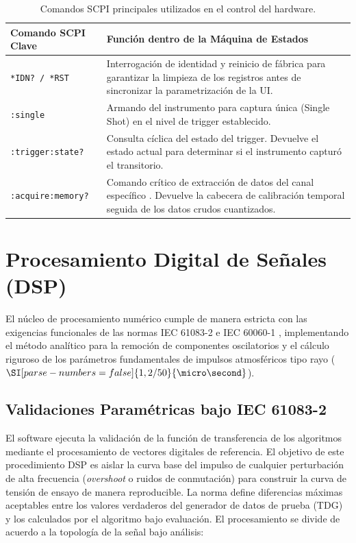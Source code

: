 \begin{table}[h]
    \centering
    \caption{Comandos SCPI principales utilizados en el control del hardware.}
    \label{tab:comandos_scpi}
    \begin{tabular}{@{}lp{10cm}@{}}
        \toprule
        \textbf{Comando SCPI Clave} & \textbf{Función dentro de la Máquina de Estados} \\ \midrule
        \texttt{*IDN? / *RST} & Interrogación de identidad y reinicio de fábrica para garantizar la limpieza de los registros antes de sincronizar la parametrización de la UI. \\ \midrule
        \texttt{:single} & Armando del instrumento para captura única (Single Shot) en el nivel de trigger establecido. \\ \midrule
        \texttt{:trigger:state?} & Consulta cíclica del estado del trigger. Devuelve el estado actual para determinar si el instrumento capturó el transitorio. \\ \midrule
        \texttt{:acquire:memory?} & Comando crítico de extracción de datos del canal específico \texttt{}. Devuelve la cabecera de calibración temporal seguida de los datos crudos cuantizados. \\ \bottomrule
    \end{tabular}
\end{table}

\section{Procesamiento Digital de Señales (DSP)}
El núcleo de procesamiento numérico cumple de manera estricta con las exigencias funcionales de las normas IEC 61083-2 \cite{iec61083_2} e IEC 60060-1 \cite{iec60060_1}, implementando el método analítico para la remoción de componentes oscilatorios y el cálculo riguroso de los parámetros fundamentales de impulsos atmosféricos tipo rayo ($\SI[parse-numbers=false]{1,2/50}{\micro\second}$).

\subsection{Validaciones Paramétricas bajo IEC 61083-2}
El software ejecuta la validación de la función de transferencia de los algoritmos mediante el procesamiento de vectores digitales de referencia. El objetivo de este procedimiento DSP es aislar la curva base del impulso de cualquier perturbación de alta frecuencia (\textit{overshoot} o ruidos de conmutación) para construir la curva de tensión de ensayo de manera reproducible. La norma define diferencias máximas aceptables entre los valores verdaderos del generador de datos de prueba (TDG) y los calculados por el algoritmo bajo evaluación. El procesamiento se divide de acuerdo a la topología de la señal bajo análisis:

